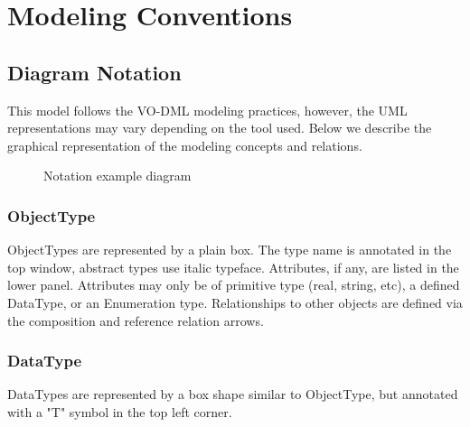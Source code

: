 \pagebreak
\section{Modeling Conventions}

\subsection{Diagram Notation}
This model follows the VO-DML modeling practices, however, the UML
representations may vary depending on the tool used.  Below we describe the
graphical representation of the modeling concepts and relations.


  \begin{figure}[h]
  \begin{center}
    \caption{Notation example diagram}\label{fig:notation_example}
  \end{center}
  \end{figure}

  \subsubsection{ObjectType}
  \label{sect:ObjectType}
  ObjectTypes are represented by a plain box. The type name is annotated in the top window, abstract
types use italic typeface. Attributes, if any, are listed in the lower panel. Attributes may only be
of primitive type (real, string, etc), a defined DataType, or an Enumeration type. Relationships to
other objects are defined via the composition and reference relation arrows.

  \subsubsection{DataType}
  \label{sect:DataType}
  DataTypes are represented by a box shape similar to ObjectType, but annotated with a "T" symbol in the top left corner.

